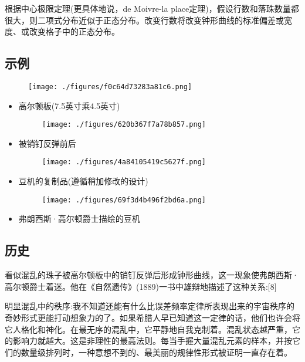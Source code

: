 根据中心极限定理(更具体地说，de Moivre-la place定理)，假设行数和落珠数量都很大，则二项式分布近似于正态分布。改变行数将改变钟形曲线的标准偏差或宽度、或改变格子中的正态分布。

\subsection{示例}

\begin{figure}[ht]
\centering
\texttt{[image: ./figures/f0c64d73283a81c6.png]}
\caption\label{fig_GRDDB_2}
\end{figure}

\begin{itemize}
\item 高尔顿板(7.5英寸乘4.5英寸)

\begin{figure}[ht]
\centering
\texttt{[image: ./figures/620b367f7a78b857.png]}
\caption \label{fig_GRDDB_6}
\end{figure}

\item 被销钉反弹前后
\begin{figure}[ht]
\centering
\texttt{[image: ./figures/4a84105419c5627f.png]}
\caption \label{fig_GRDDB_7}
\end{figure}

\item 豆机的复制品(遵循稍加修改的设计)
\begin{figure}[ht]
\centering
\texttt{[image: ./figures/69f3d4b496f2bd6a.png]}
\caption\label{fig_GRDDB_8}
\end{figure}

\item 弗朗西斯·高尔顿爵士描绘的豆机
\end{itemize}

\subsection{历史}

看似混乱的珠子被高尔顿板中的销钉反弹后形成钟形曲线，这一现象使弗朗西斯·高尔顿爵士着迷。他在《自然遗传》(1889)一书中雄辩地描述了这种关系:[8]

明显混乱中的秩序:我不知道还能有什么比误差频率定律所表现出来的宇宙秩序的奇妙形式更能打动想象力的了。如果希腊人早已知道这一定律的话，他们也许会将它人格化和神化。在最无序的混乱中，它平静地自我克制着。混乱状态越严重，它的影响力就越大。这是非理性的最高法则。每当手握大量混乱元素的样本，并按它们的数量级排列时，一种意想不到的、最美丽的规律性形式被证明一直存在着。

